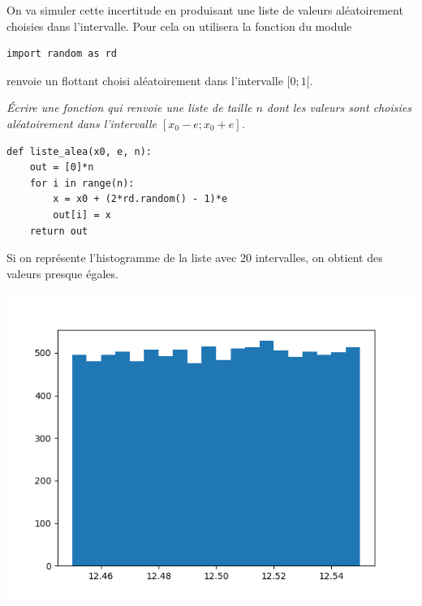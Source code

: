 On va simuler cette incertitude en produisant une liste de valeurs aléatoirement choisies dans l'intervalle. Pour cela on utilisera la fonction  du module 
\begin{lstlisting}
import random as rd
\end{lstlisting}
 renvoie un flottant choisi aléatoirement dans l'intervalle $[0;1[$.
\begin{Exercise}\it 
Écrire une fonction  qui renvoie une liste de taille $n$ dont les valeurs sont choisies aléatoirement dans l'intervalle $[x_0 - e; x_0 + e]$.
\end{Exercise}
\begin{Answer}
\begin{lstlisting}
def liste_alea(x0, e, n):
    out = [0]*n
    for i in range(n):
        x = x0 + (2*rd.random() - 1)*e
        out[i] = x
    return out
\end{lstlisting}
\end{Answer}
\begin{minipage}{0.6\linewidth}
Si on représente l'histogramme de la liste  avec 20 intervalles, on obtient des valeurs presque égales.
\end{minipage}
\begin{minipage}{0.4\linewidth}
\begin{center}
\includegraphics[scale=0.3]{TP/Images/TP17_histo3.png}
\end{center}
\end{minipage}

